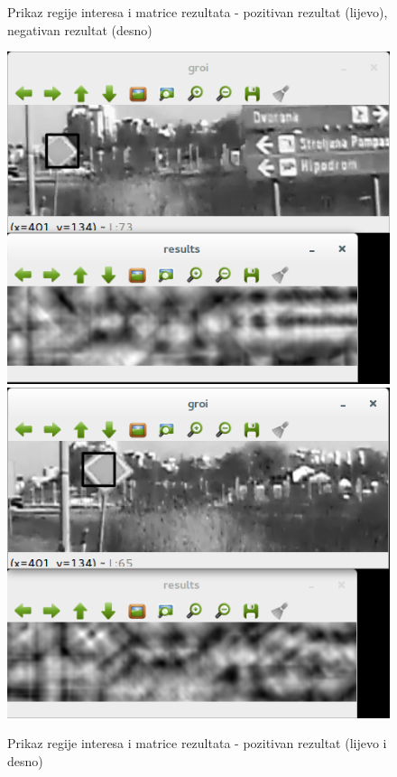 \begin{figure}[!htb]
\endminipage\hfill
\caption{Prikaz regije interesa i matrice rezultata - pozitivan rezultat 
(lijevo), negativan rezultat (desno)}
\label{fig:pr2}
\end{figure}

\begin{figure}[!htb]
    \includegraphics[width=\linewidth]{figures/16.png}
\endminipage\hfill
{}
    \includegraphics[width=\linewidth]{figures/17.png}
\endminipage\hfill
\caption{Prikaz regije interesa i matrice rezultata - pozitivan rezultat
(lijevo i desno)}
\label{fig:pr3}
\end{figure}

